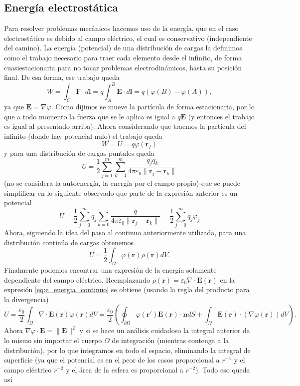 \documentclass[11pt,a4paper]{article}
\numberwithin{equation}{section}
\begin{document}
\subsection{Energía electrostática}
\label{sec:e_energia}
Para resolver problemas mecánicos hacemos uso de la energía, que en el caso electrostático es debido al campo eléctrico, el cual es conservativo (independiente del camino). La energía (potencial) de una distribución de cargas la definimos como el trabajo necesario para traer cada elemento desde el infinito, de forma cuasiestacionaria para no tocar problemas electrodinámicos, hasta su posición final. De esa forma, ese trabajo queda \[W = \int_{C} \textbf{F} \cdot d\textbf{l} = q \int_A^B \textbf{E} \cdot d\textbf{l} = q (\varphi(B) - \varphi(A)),\] ya que $\textbf{E} = \nabla \varphi$. Como dijimos se mueve la partícula de forma estacionaria, por lo que a todo momento la fuerza que se le aplica es igual a $q\textbf{E}$ (y entonces el trabajo es igual al presentado arriba). Ahora considerando que traemos la partícula del infinito (donde hay potencial nulo) el trabajo queda
\begin{equation}
    W = U = q \varphi(\textbf{r}_f)
    \label{eq:e_trabajo_particula}
\end{equation}
y para una distribución de cargas puntales queda \[U = \frac{1}{2} \sum_{j = 1}^m \sum_{k = 1}^m \frac{q_j q_k}{4\pi\varepsilon_0\|\textbf{r}_j - \textbf{r}_k\|}\] (no se considera la autoenergía, la energía por el campo propio) que se puede simplificar en lo siguiente observado que parte de la expresión anterior es un potencial
\begin{equation}
    U = \frac{1}{2} \sum_{j = 0}^m q_j \sum_{k = 0} \frac{q}{4\pi\varepsilon_0 \|\textbf{r}_j - \textbf{r}_k\|} = \frac{1}{2} \sum_{j = 0}^m q_j \varphi_j
    \label{eq:e_energia_discreta}
\end{equation}
Ahora, siguiendo la idea del paso al continuo anteriormente utilizada, para una distribución continúa de cargas obtenemos
\begin{equation}
    U = \frac{1}{2} \int_{\Omega} \varphi(\textbf{r}) \rho(\textbf{r}) dV.
    \label{eq:e_energia_continuo}
\end{equation}
Finalmente podemos encontrar una expresión de la energía solamente dependiente del campo eléctrico. Reemplazando $\rho(\textbf{r}) = \varepsilon_0 \nabla \cdot \textbf{E}(\textbf{r})$ en la expresión \ref{eq:e_energia_continuo} se obtiene (usando la regla del producto para la divergencia) \[U = \frac{\varepsilon_0}{2}\int_{\Omega} \nabla \cdot \textbf{E}(\textbf{r}) \varphi(\textbf{r}) dV = \frac{\varepsilon_0}{2}\left(\oint_{\partial \Omega} \varphi(\textbf{r}') \textbf{E}(\textbf{r}) \cdot \textbf{n} dS +  \int_{\Omega} \textbf{E}(\textbf{r}) \cdot (\nabla \varphi(\textbf{r})) dV\right).\] Ahora $\nabla\varphi \cdot \textbf{E} = \|\textbf{E}\|^2$ y si se hace un análisis cuidadoso la integral anterior da lo mismo sin importar el cuerpo $\Omega$ de integración (mientras contenga a la distribución), por lo que integramos en todo el espacio, eliminando la integral de superficie (ya que el potencial es en el peor de los casos proporcional a $r^{-1}$ y el campo eléctrico $r^{-2}$ y el área de la esfera es proporcional a $r^{-2}$). Todo eso queda así
\end{document}
